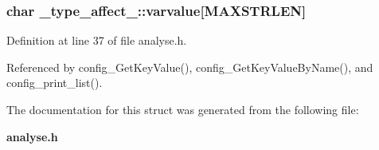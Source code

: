 \subsubsection{\setlength{\rightskip}{0pt plus 5cm}char {\bf \_\-type\_\-affect\_\-::varvalue}[MAXSTRLEN]}\label{struct__type__affect___o1}




Definition at line 37 of file analyse.h.

Referenced by config\_\-Get\-Key\-Value(), config\_\-Get\-Key\-Value\-By\-Name(), and config\_\-print\_\-list().

The documentation for this struct was generated from the following file:\begin{CompactItemize}
\item 
{\bf analyse.h}\end{CompactItemize}
